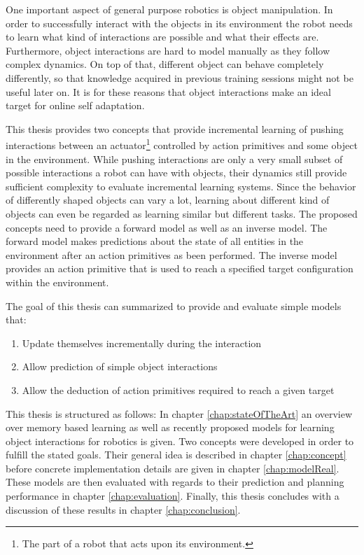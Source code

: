 One important aspect of general purpose robotics is object manipulation. In order to successfully interact with the objects in its environment the robot needs to learn what kind of interactions are possible and what their effects are. 
Furthermore, object interactions are hard to model manually as they follow complex dynamics. On top of that, different object can behave completely differently, so that knowledge acquired in previous training sessions might not be useful later on. It is for these reasons that object interactions make an ideal target for online self adaptation. 

This thesis provides two concepts that provide incremental learning of pushing interactions between an actuator\footnote{The part of a robot that acts upon its environment.} controlled by action primitives and some object in the environment.
While pushing interactions are only a very small subset of possible interactions a robot can have with objects, their dynamics still provide sufficient complexity to evaluate incremental learning systems. Since the behavior of differently shaped objects can vary a lot, learning about different kind of objects can even be regarded as learning similar but different tasks.%
The proposed concepts need to provide a forward model as well as an inverse model. The forward model makes predictions about the state of all entities in the environment after an action primitives as been performed. The inverse model provides an action primitive that is used to reach a specified target configuration within the environment.

The goal of this thesis can summarized to provide and evaluate simple models that:
\begin{enumerate}
	\item Update themselves incrementally during the interaction
	\item Allow prediction of simple object interactions %
	\item Allow the deduction of action primitives required to reach a given target 
\end{enumerate}

This thesis is structured as follows: In chapter \ref{chap:stateOfTheArt} an overview over memory based learning as well as recently proposed models for learning object interactions for robotics is given. Two concepts were developed in order to fulfill the stated goals. Their general idea is described in chapter \ref{chap:concept} before concrete implementation details are given in chapter \ref{chap:modelReal}. These models are then evaluated with regards to their prediction and planning performance in chapter \ref{chap:evaluation}. Finally, this thesis concludes with a discussion of these results in chapter \ref{chap:conclusion}.

